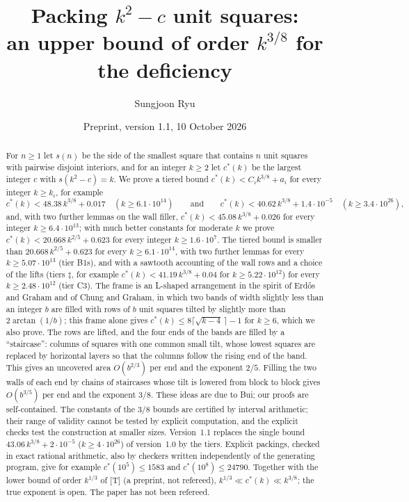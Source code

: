 \documentclass[11pt]{amsart}
\title[An upper bound of order $k^{3/8}$ for the deficiency]{Packing $k^2-c$ unit squares:\\ an upper bound of order $k^{3/8}$ for the deficiency}
\author{Sungjoon Ryu}
\date{Preprint, version 1.1, 10 October 2026}
\newcommand{\cs}{c^{*}}
\theoremstyle{definition}
\theoremstyle{remark}
\numberwithin{equation}{section}
\begin{document}
\begin{abstract}
For $n\ge1$ let $s(n)$ be the side of the smallest square that contains $n$ unit squares with pairwise disjoint
interiors, and for an integer $k\ge2$ let $\cs(k)$ be the largest integer $c$ with $s(k^2-c)=k$. We prove a tiered
bound $\cs(k)<C_ik^{3/8}+a_i$ for every integer $k\ge k_i$, for example
\[
\cs(k)<48.38\,k^{3/8}+0.017\quad(k\ge6.1\cdot10^{14})\qquad\text{and}\qquad
\cs(k)<40.62\,k^{3/8}+1.4\cdot10^{-5}\quad(k\ge3.4\cdot10^{26}),
\]
and, with two further lemmas on the wall filler, $\cs(k)<45.08\,k^{3/8}+0.026$ for every integer
$k\ge6.4\cdot10^{13}$;
with much better constants for moderate $k$ we prove $\cs(k)<20.668\,k^{2/5}+0.623$ for every integer
$k\ge1.6\cdot10^7$.
The tiered bound is smaller than $20.668\,k^{2/5}+0.623$ for every $k\ge6.1\cdot10^{14}$, with two further lemmas for every
$k\ge5.07\cdot10^{13}$ (tier B1s), and with a sawtooth accounting of the wall rows and a choice of the lifts (tiers
$\ddagger$, for example $\cs(k)<41.19\,k^{3/8}+0.04$ for $k\ge5.22\cdot10^{12}$) for every $k\ge2.48\cdot10^{12}$
(tier C3).
The frame is an L-shaped arrangement in the spirit of Erd\H{o}s and Graham and of
Chung and Graham, in which two bands of width slightly less than an integer $b$ are filled with rows of $b$ unit squares
tilted by slightly more than $2\arctan(1/b)$; this frame alone gives $\cs(k)\le8\lceil\sqrt{k-4}\,\rceil-1$ for $k\ge6$,
which we also prove. The rows are lifted, and the four ends of the bands are filled by a ``staircase'': columns of
squares with one common small tilt, whose lowest squares are replaced by horizontal layers so that the columns follow
the rising end of the band. This gives an uncovered area $O(b^{2/3})$ per end and the exponent $2/5$. Filling the two
walls of each end by chains of staircases whose tilt is lowered from block to block gives $O(b^{3/5})$ per end and the
exponent $3/8$. These ideas are due to Bui; our proofs are self-contained. The constants of the $3/8$ bounds are
certified by interval arithmetic; their range of validity cannot be tested by explicit computation, and the explicit
checks test the construction at smaller sizes. Version~1.1 replaces the single bound $43.06\,k^{3/8}+2\cdot10^{-5}$
($k\ge4\cdot10^{26}$) of version~1.0 by the tiers. Explicit packings, checked in exact rational arithmetic, also by
checkers written independently of the generating program, give for example $\cs(10^5)\le1583$ and
$\cs(10^8)\le24790$. Together with the lower bound of order $k^{1/3}$ of [T] (a preprint, not refereed),
$k^{1/3}\ll\cs(k)\ll k^{3/8}$; the true exponent is open. The paper has not been refereed.
\end{abstract}
\maketitle
\end{document}
